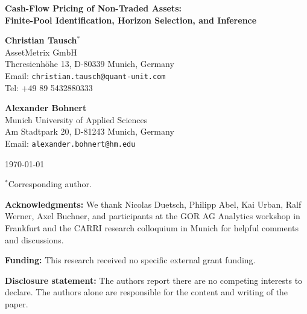 \documentclass[12pt]{article}
\begin{document}
\thispagestyle{empty}

\begin{center}
{\Large\bfseries Cash-Flow Pricing of Non-Traded Assets: \\[0.5ex] Finite-Pool Identification, Horizon Selection, and Inference\par}

\vspace{0.7in}

\textbf{Christian Tausch}$^{\ast}$\\
AssetMetrix GmbH\\
Theresienh\"{o}he 13, D-80339 Munich, Germany\\
Email: \texttt{christian.tausch@quant-unit.com}\\
Tel: +49 89 5432880333

\vspace{1.8em}

\textbf{Alexander Bohnert}\\
Munich University of Applied Sciences\\
Am Stadtpark 20, D-81243 Munich, Germany\\
Email: \texttt{alexander.bohnert@hm.edu}

\vspace{1.8em}
\today
\end{center}

\vfill

\singlespacing
\noindent $^{\ast}$Corresponding author.

\medskip
\noindent\textbf{Acknowledgments:} We thank Nicolas Duetsch, Philipp Abel, Kai Urban, Ralf Werner, Axel Buchner, and participants at the GOR AG Analytics workshop in Frankfurt and the CARRI research colloquium in Munich for helpful comments and discussions.

\medskip
\noindent\textbf{Funding:} This research received no specific external grant funding.

\medskip
\noindent\textbf{Disclosure statement:} The authors report there are no competing interests to declare. The authors alone are responsible for the content and writing of the paper.
\end{document}
